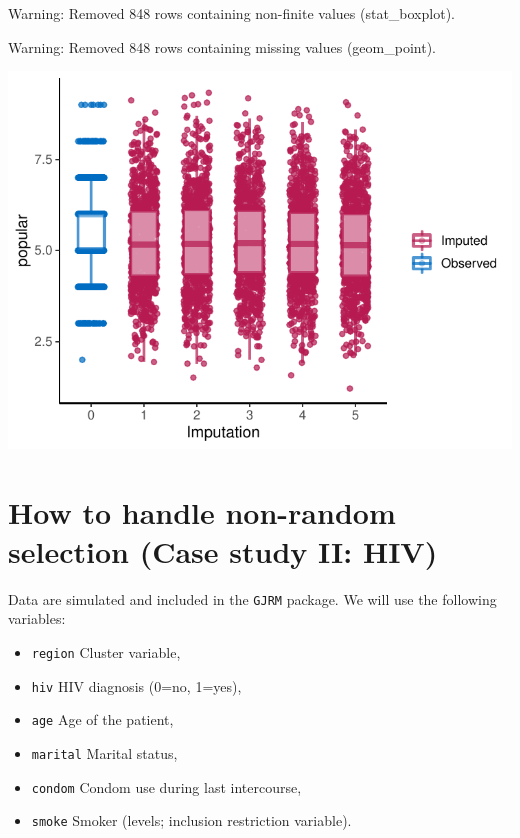 \documentclass[
]{jss}
\providecommand{\tightlist}{%
  \setlength{\itemsep}{0pt}\setlength{\parskip}{0pt}}
\begin{document}
\begin{CodeChunk}
\begin{CodeOutput}
Warning: Removed 848 rows containing non-finite values (stat_boxplot).
\end{CodeOutput}
\begin{CodeOutput}
Warning: Removed 848 rows containing missing values (geom_point).
\end{CodeOutput}


\begin{center}\includegraphics{Manuscript_files/figure-latex/pop_pan_eval-1} \end{center}

\end{CodeChunk}

\hypertarget{how-to-handle-non-random-selection-case-study-ii-hiv}{%
\section{How to handle non-random selection (Case study II:
HIV)}\label{how-to-handle-non-random-selection-case-study-ii-hiv}}

Data are simulated and included in the \texttt{GJRM} package. We will
use the following variables:

\begin{itemize}
\tightlist
\item
  \texttt{region} Cluster variable,
\item
  \texttt{hiv} HIV diagnosis (0=no, 1=yes),
\item
  \texttt{age} Age of the patient,
\item
  \texttt{marital} Marital status,
\item
  \texttt{condom} Condom use during last intercourse,
\item
  \texttt{smoke} Smoker (levels; inclusion restriction variable).
\end{itemize}
\end{document}
